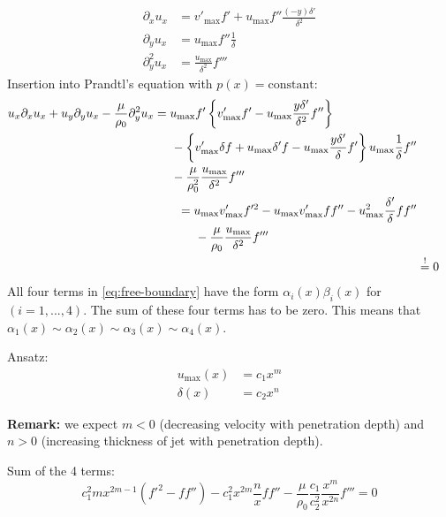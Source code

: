 \begin{align}
\partial_xu_x &= v'_\mathrm{max}f'+u_\mathrm{max}f''\frac{(-y)\delta'}{\delta^2} \\
\partial_yu_x &= u_\mathrm{max} f''\frac{1}{\delta}\\
\partial^2_yu_x &= \frac{u_\mathrm{max}}{\delta^2}f'''
\end{align}
Insertion into Prandtl's equation with $p(x)=\text{constant}$:
\begin{align}
\begin{split}
u_x\partial_x u_x+u_y\partial_yu_x-\frac{\mu}{\rho_0}\partial^2_yu_x &= u_\mathrm{max}f'\left\lbrace v'_\mathrm{max}f' - u_\mathrm{max}\frac{y\delta'}{\delta^2}f''\right\rbrace \\
&\hspace{5mm}-\left\lbrace v'_\mathrm{max}\delta f + u_\mathrm{max}\delta'f-u_\mathrm{max}\frac{y\delta'}{\delta}f'\right\rbrace u_\mathrm{max}\frac{1}{\delta}f'' \\
&\hspace{5mm}-\frac{\mu}{\rho_0^2} \frac{u_\mathrm{max}}{\delta^2}f'''
\end{split}\\
\begin{split}
&= u_\mathrm{max}v'_\mathrm{max}f'^2-u_\mathrm{max}v'_\mathrm{max}ff''-u_\mathrm{max}^2\frac{\delta'}{\delta}ff'' \\
&\hspace{5mm}-\frac{\mu}{\rho_0}\frac{u_\mathrm{max}}{\delta^2}f'''\label{eq:free-boundary}
\end{split} \\
&\overset{!}{=}0 \label{eq:prandtl}
\end{align}
All four terms in \eqref{eq:free-boundary} have the form $\alpha_i(x)\beta_i(x)$ for $(i=1,...,4)$. The sum of these four terms has to be zero. This means that $\alpha_1(x)\sim\alpha_2(x)\sim\alpha_3(x)\sim\alpha_4(x)$.

Ansatz:
\begin{align}
u_\mathrm{max}(x) &= c_1x^m\\
\delta(x) &= c_2 x^n
\end{align}

\begin{framed}
\textbf{Remark:} we expect $m<0$ (decreasing velocity with penetration depth) and $n>0$ (increasing thickness of jet with penetration depth).
\end{framed}

Sum of the 4 terms:
\begin{equation}
c_1^2mx^{2m-1}(f'^2-ff'')-c_1^2x^{2m}\frac{n}{x}ff'' - \frac{\mu}{\rho_0}\frac{c_1}{c_2^2}\frac{x^m}{x^{2n}}f'''=0
\end{equation}

